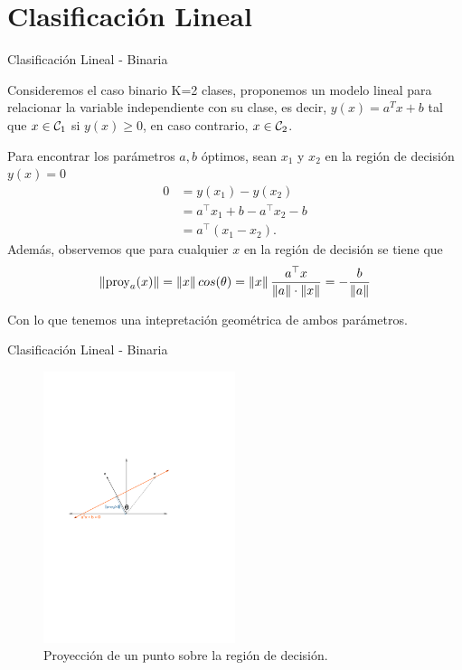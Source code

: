 \documentclass[9pt]{beamer}
\begin{document}
\section{Clasificación Lineal}

\begin{frame}{Clasificación Lineal - Binaria}

Consideremos el caso binario K=2 clases, proponemos un modelo lineal para relacionar la variable independiente con su clase, es decir, $y(x) = a^Tx+b$ tal que  $x \in {\mathcal C}_1$ si $y(x) \geq 0$, en caso contrario,  $x \in {\mathcal C}_2$. \pause

Para encontrar los parámetros $a,b$ óptimos, sean $x_1$ y $x_2$ en la región de decisión $y(x)=0$ \pause  
\begin{align*}
  0 &= y(x_1) - y(x_2) \nonumber\\ 
    &= a^\top x_1 + b - a^\top x_2 - b \nonumber\\ 
    &= a^\top (x_1-x_2).
\end{align*}
\pause
Además, observemos que para cualquier $x$ en la región de decisión se tiene que 
\begin{equation*}
  \left\lVert\text{proy}_a(x)\right\rVert = \left\lVert x\right\rVert cos(\theta) = \left\lVert x\right\rVert \frac{a^\top x}{\left\lVert a\right\rVert\cdot\left\lVert x\right\rVert} = -\frac{b}{\left\lVert a\right\rVert}
\end{equation*}

Con lo que tenemos una intepretación geométrica de ambos parámetros. 

\end{frame}

\begin{frame}{Clasificación Lineal - Binaria}

\begin{figure}[h]
    \centering
    \includegraphics[width=0.5\textwidth]{../img/cap3_proy.pdf}
    \caption{Proyección de un punto sobre la región de decisión. }
\end{figure}


\end{frame}
\end{document}

